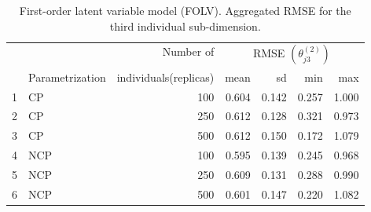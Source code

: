 %
\begin{table}[H]
	\centering
	\begin{tabular}{rlrrrrr}
		\hline
		\multicolumn{2}{c}{ } & Number of & \multicolumn{4}{c}{ RMSE $( \theta^{(2)}_{j3} )$} \\ 
		\cmidrule(rl){4-7}
		& Parametrization & individuals(replicas) & mean & sd & min & max \\  
		\hline\hline
		1 & CP &  100 & 0.604 & 0.142 & 0.257 & 1.000 \\  
		2 & CP &  250 & 0.612 & 0.128 & 0.321 & 0.973 \\  
		3 & CP &  500 & 0.612 & 0.150 & 0.172 & 1.079 \\ 
		\hline
		4 & NCP &  100 & 0.595 & 0.139 & 0.245 & 0.968 \\  
		5 & NCP &  250 & 0.609 & 0.131 & 0.288 & 0.990 \\ 
		6 & NCP &  500 & 0.601 & 0.147 & 0.220 & 1.082 \\  
		\hline
	\end{tabular}
	\caption[First-order latent variable model (FOLV). Aggregated RMSE for the third individual sub-dimension.]%
	{First-order latent variable model (FOLV). Aggregated RMSE for the third individual sub-dimension.}
	\label{tab:FOLV_RMSE_theta3}
\end{table}
%
